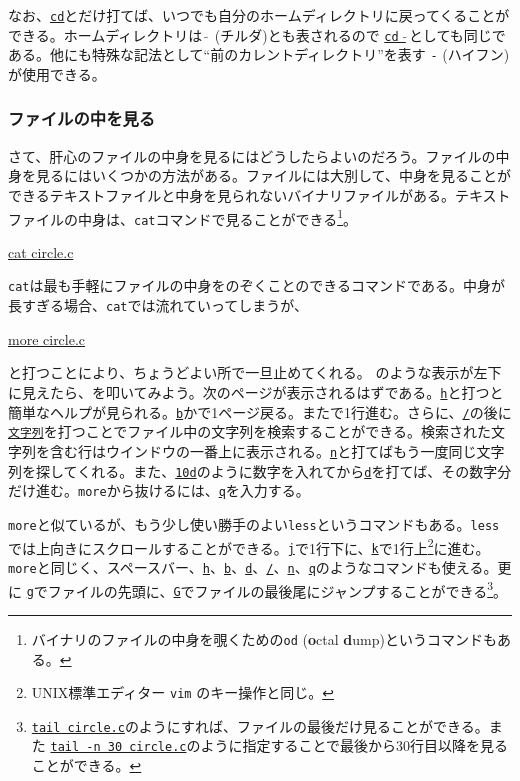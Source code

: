 なお、\underline{\texttt{cd}}とだけ打てば、いつでも自分のホームディレクトリに戻ってくることができる。ホームディレクトリは \(\tilde{\ }\) (チルダ)とも表されるので \underline{\texttt{cd \(\tilde{\ }\)}}としても同じである。他にも特殊な記法として``前のカレントディレクトリ''を表す \texttt{-} (ハイフン)が使用できる。

\subsubsection*{ファイルの中を見る}

さて、肝心のファイルの中身を見るにはどうしたらよいのだろう。ファイルの中身を見るにはいくつかの方法がある。ファイルには大別して、中身を見ることができるテキストファイルと中身を見られないバイナリファイルがある。テキストファイルの中身は、\texttt{cat}コマンドで見ることができる\footnote{バイナリのファイルの中身を覗くための\texttt{od} (\textbf{o}ctal \textbf{d}ump)というコマンドもある。}。
\begin{commandline2}
    \prompt \underline{cat circle.c}
\end{commandline2} \noindent
\texttt{cat}は最も手軽にファイルの中身をのぞくことのできるコマンドである。中身が長すぎる場合、\texttt{cat}では流れていってしまうが、
\begin{commandline2}
    \prompt \underline{more circle.c}
\end{commandline2} \noindent
と打つことにより、ちょうどよい所で一旦止めてくれる。 のような表示が左下に見えたら、\spc を叩いてみよう。次のページが表示されるはずである。\underline{\texttt{h}}と打つと簡単なヘルプが見られる。\underline{\texttt{b}}かで1ページ戻る。また\ret で1行進む。さらに、\underline{\texttt{/}}の後に\underline{\texttt{文字列}}を打つことでファイル中の文字列を検索することができる。検索された文字列を含む行はウインドウの一番上に表示される。\underline{\texttt{n}}と打てばもう一度同じ文字列を探してくれる。また、\underline{\texttt{10d}}のように数字を入れてから\underline{\texttt{d}}を打てば、その数字分だけ進む。\texttt{more}から抜けるには、\underline{\texttt{q}}を入力する。

\texttt{more}と似ているが、もう少し使い勝手のよい\texttt{less}\label{sect:less}というコマンドもある。\texttt{less}では上向きにスクロールすることができる。\underline{\texttt{j}}で1行下に、\underline{\texttt{k}}で1行上\footnote{UNIX標準エディター \texttt{vim} のキー操作と同じ。}に進む。\texttt{more}と同じく、スペースバー、\underline{\texttt{h}}、\underline{\texttt{b}}、\underline{\texttt{d}}、\underline{\texttt{/}}、\underline{\texttt{n}}、\underline{\texttt{q}}のようなコマンドも使える。更に \underline{\texttt{g}}でファイルの先頭に、\underline{\texttt{G}}でファイルの最後尾にジャンプすることができる\footnote{\texttt{\underline{tail circle.c}}のようにすれば、ファイルの最後だけ見ることができる。また \underline{\texttt{tail -n 30 circle.c}}のように指定することで最後から30行目以降を見ることができる。}。

